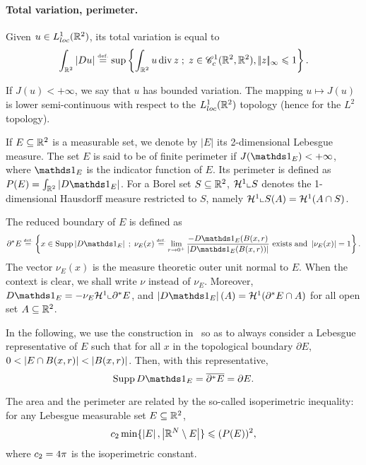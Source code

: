 \paragraph{Total variation, perimeter.}
Given $u\in L^1_{loc}(\mathbb{R}^2)$, its total variation is equal to
\begin{align*}
\int_{\mathbb{R}^2} \left| Du \right| \stackrel{\mbox{\upshape\tiny def.}}{=} \sup \left\{ \int_{\mathbb{R}^2}u \operatorname{div} z  \;;\; z\in \mathscr{C}^{1}_c(\mathbb{R}^2,\mathbb{R}^2), |\!| z |\!|_{\infty}\leqslant 1  \right\}.
\end{align*}


If $J(u)<+\infty$, we say that $u$ has bounded variation.
The mapping $u\mapsto J(u)$ is lower semi-continuous  with respect to the $L^1_{loc}(\mathbb{R}^2)$ topology (hence for the $L^2$ topology).

If $E\subseteq \mathbb{R}^2$ is a measurable set, we denote by $|E|$ its 2-dimensional Lebesgue measure. The set $E$ is said to be of finite perimeter if $J(\bun{E})<+\infty$, where $\bun{E}$ is the indicator function of $E$. Its perimeter is defined as $P(E)=\int_{\RR^2} |D\bun{E}|$. For a Borel set $S\subseteq \mathbb{R}^2$, $\mathcal{H}^1\llcorner S$ denotes the 1-dimensional Hausdorff measure restricted to $S$, namely $\mathcal{H}^1\llcorner S(A)=\mathcal{H}^1(A\cap S)$. 

The reduced boundary of $E$ is defined as
\begin{equation}
  \partial^* E\eqdef \enscond{x\in \supp \abs{D\bun{E}}}{\nu_E(x)\eqdef \lim_{r\to 0^+}\frac{-D\bun{E}(B(x,r)}{\abs{D\bun{E}(B(x,r))}}\mbox{ exists and }\abs{\nu_E(x)}=1}. 
\end{equation}
The vector $\nu_E(x)$ is the measure theoretic outer unit normal to $E$. When the context is clear, we shall write $\nu$ instead of $\nu_E$. Moreover, $D\bun{E}=-\nu_E\Hh^1\llcorner \partial^*E$, and $\abs{D\bun{E}}(A)=\Hh^1(\partial^*E \cap A)$ for all open set $A\subseteq \mathbb{R}^2$.

In the following, we use the construction in~\cite[Prop.~3.1]{giusti1977minimal} so as to always consider a Lebesgue representative of $E$ such that for all $x$ in the topological boundary $\partial E$, $0<\left| E\cap B(x,r) \right|<\left| B(x,r) \right|$. Then, with this representative,
\begin{equation*}
  \supp D\bun{E}=\overline{\partial^*E}=\partial E.
\end{equation*}

The area and the perimeter are related by the so-called isoperimetric inequality: for any Lebesgue measurable set $E\subseteq \mathbb{R}^2$, 
$$c_2\min\{\left| E \right|,\left| \mathbb{R}^N\setminus E \right|\}\leqslant (P(E))^2,$$ where  $c_2=4\pi$ is the isoperimetric constant.

